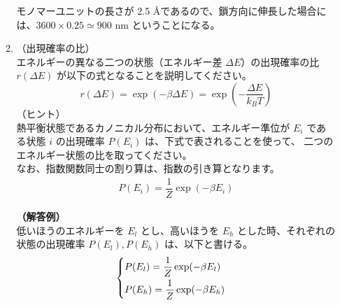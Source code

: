 \documentclass[uplatex,dvipdfmx,a4paper,11pt, titlepage]{jsarticle}
\begin{document}
\begin{itemize}
\begin{enumerate}
		モノマーユニットの長さが 2.5 \AA であるので、鎖方向に伸長した場合には、$3600 \times 0.25 \simeq 900$ nm ということになる。

		\item
		（出現確率の比）\\
		エネルギーの異なる二つの状態（エネルギー差 $\Delta E$）の出現確率の比 $r(\Delta E)$ が以下の式となることを説明してください。
		\begin{equation*}
		r(\Delta E) = \exp(-\beta \Delta E)=\exp \left( -\dfrac{\Delta E}{k_B T} \right)
		\end{equation*}
		（ヒント）\\
		熱平衡状態であるカノニカル分布において、エネルギー準位が $E_i$ である状態 $i$ の出現確率 $P(E_i)$ は、下式で表されることを使って、
		二つのエネルギー状態の比を取ってください。\\
		なお、指数関数同士の割り算は、指数の引き算となります。
		\begin{align*}
		P(E_i) = \dfrac{1}{Z} \exp(-\beta E_i)
		\end{align*}

		{\bf（解答例）}\\
		低いほうのエネルギーを $E_l$ とし、高いほうを $E_h$ とした時、それぞれの状態の出現確率 $P(E_l), P(E_h)$ は、以下と書ける。
		\begin{align*}
			\begin{cases}
			P(E_l) = \dfrac{1}{Z} \exp(-\beta E_l) \notag \\[6pt]
			P(E_h) = \dfrac{1}{Z} \exp(-\beta E_h)
			\end{cases}
		\end{align*}


\end{enumerate}
\end{itemize}
\end{document}
